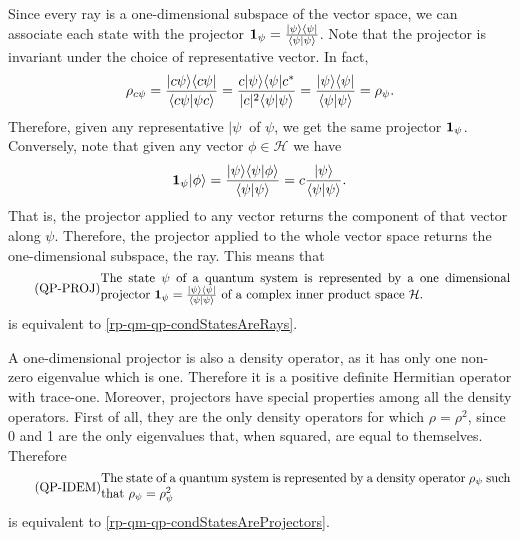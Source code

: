 Since every ray is a one-dimensional subspace of the vector space, we can associate each state with the projector $\indicator[\psi] = \frac{| \psi \> \< \psi |}{\< \psi | \psi \>}$. Note that the projector is invariant under the choice of representative vector. In fact,
\begin{equation}
	\rho_{c\psi} = \frac{| c \psi \> \< c\psi |}{\< c\psi | \psi c\>} = \frac{ c | \psi \> \< \psi | c^*}{ |c|^2 \< \psi | \psi \>}  = \frac{| \psi \> \< \psi |}{\< \psi | \psi \>} =\rho_{\psi}.
\end{equation}
Therefore, given any representative $|\psi \>$ of $\psi$, we get the same projector $\indicator[\psi]$. Conversely, note that given any vector $\phi \in \mathcal{H}$ we have
\begin{equation}
	\indicator[\psi] |\phi\> = \frac{| \psi \> \< \psi |\phi\>}{\< \psi | \psi \>} = c \frac{| \psi \>}{\< \psi | \psi \>}.
\end{equation}
That is, the projector applied to any vector returns the component of that vector along $\psi$. Therefore, the projector applied to the whole vector space returns the one-dimensional subspace, the ray. This means that
\begin{equation}\label{rp-qm-qp-condStatesAreProjectors}
	\tag{QP-PROJ}
	\eqtext{The state $\psi$ of a quantum system is represented by a one dimensional projector $\indicator[\psi] = \frac{| \psi \> \< \psi |}{\< \psi | \psi \>}$ of a complex inner product space $\mathcal{H}$.}
\end{equation}
is equivalent to \ref{rp-qm-qp-condStatesAreRays}.

A one-dimensional projector is also a density operator, as it has only one non-zero eigenvalue which is one. Therefore it is a positive definite Hermitian operator with trace-one. Moreover, projectors have special properties among all the density operators. First of all, they are the only density operators for which $\rho = \rho^2$, since 0 and 1 are the only eigenvalues that, when squared, are equal to themselves. Therefore 
\begin{equation}\label{rp-qm-qp-condStatesAreIdempotent}
	\tag{QP-IDEM}
	\eqtext{The state of a quantum system is represented by a density operator $\rho_{\psi}$ such that $\rho_{\psi} = \rho_{\psi}^2$}
\end{equation}
is equivalent to \ref{rp-qm-qp-condStatesAreProjectors}.

